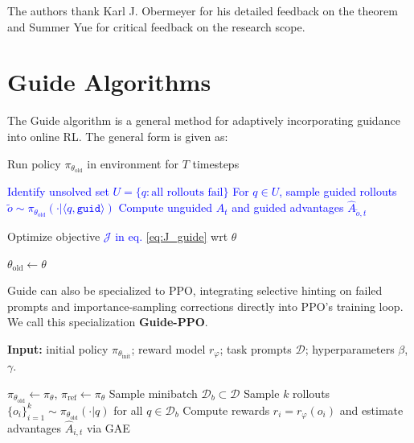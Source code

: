 \documentclass{article}
\begin{document}
\begin{ack}
The authors thank Karl J. Obermeyer for his detailed feedback on the theorem and Summer Yue for critical feedback on the research scope.
\end{ack}




\medskip


{
\small

\appendix
\newpage 
\section{Guide Algorithms}
\label{app:Guide}

The Guide algorithm is a general method for adaptively incorporating guidance into online RL. The general form is given as:

\begin{algorithm}[H]
\caption{Guide}
\begin{algorithmic}[1]
        \State Run policy $\pi_{\theta_{\text{old}}}$ in environment for $T$ timesteps
    \EndFor

    \State \textcolor{blue}{Identify unsolved set $U=\{q : \text{all rollouts fail}\}$}
    \State \textcolor{blue}{For $q\in U$, sample guided rollouts $\tilde{o}\sim\pi_{\theta_{\text{old}}}(\cdot|\langle q,\texttt{guid}\rangle)$}
    \State \textcolor{blue}{Compute unguided $\hat{A}_t$ and guided advantages $\hat{A}_{\tilde{o},t}$ }

    \State Optimize objective \textcolor{blue}{$\mathcal{J}$ in eq. \ref{eq:J_guide}} wrt $\theta$

    \State $\theta_{\text{old}} \leftarrow \theta$
\EndFor
\end{algorithmic}
\end{algorithm}

Guide can also be specialized to PPO, integrating selective hinting on failed prompts and importance-sampling corrections directly into PPO's training loop. We call this specialization \textbf{Guide-PPO}.

\begin{algorithm}[H]
\caption{Guide-PPO}
\label{alg:guide-ppo}
\small
\textbf{Input:} initial policy $\pi_{\theta_\text{init}}$; reward model $r_\varphi$; task prompts $\mathcal D$; hyperparameters $\beta$, $\gamma$.
\begin{algorithmic}[1]
    \State $\pi_{\theta_\text{old}} \gets \pi_\theta$, \quad $\pi_{\text{ref}} \gets \pi_\theta$
    \State Sample minibatch $\mathcal{D}_b \subset \mathcal{D}$
    \State Sample $k$ rollouts $\{o_i\}_{i=1}^{k} \sim \pi_{\theta_\text{old}}(\cdot|q)$ for all $q \in \mathcal{D}_b$
    \State Compute rewards $r_i = r_\varphi(o_i)$ and estimate advantages $\hat{A}_{i,t}$ via GAE


\end{algorithmic}
\end{algorithm}}
\end{document}
